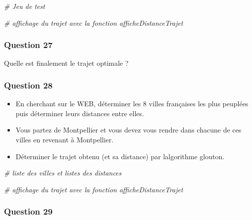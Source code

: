\documentclass[
  paper=a4,
  ,captions=tableheading
]{scrartcl}
\newenvironment{Shaded}{}{}
\newcommand{\CommentTok}[1]{\textcolor[rgb]{0.38,0.63,0.69}{\textit{#1}}}
\begin{document}
\begin{Shaded}
\begin{Highlighting}[]
\CommentTok{\# Jeu de test}
\end{Highlighting}
\end{Shaded}

\begin{Shaded}
\begin{Highlighting}[]
\CommentTok{\# affichage du trajet avec la fonction afficheDistanceTrajet}
\end{Highlighting}
\end{Shaded}

\hypertarget{question-27}{%
\subsubsection{Question 27}\label{question-27}}

Quelle est finalement le trajet optimale ?

\hypertarget{question-28}{%
\subsubsection{Question 28}\label{question-28}}

\begin{itemize}
\item
  En cherchant sur le WEB, déterminer les 8 villes françaises les plus
  peuplées puis déterminer leurs distances entre elles.
\item
  Vous partez de Montpellier et vous devez vous rendre dans chacune de
  ces villes en revenant à Montpellier.
\item
  Déterminer le trajet obtenu (et sa distance) par
  l\textquotesingle algorithme glouton.
\end{itemize}

\begin{Shaded}
\begin{Highlighting}[]
\CommentTok{\# liste des villes et listes des distances}
\end{Highlighting}
\end{Shaded}

\begin{Shaded}
\begin{Highlighting}[]
\CommentTok{\# affichage du trajet avec la fonction afficheDistanceTrajet}
\end{Highlighting}
\end{Shaded}

\hypertarget{question-29}{%
\subsubsection{Question 29}\label{question-29}}
\end{document}
